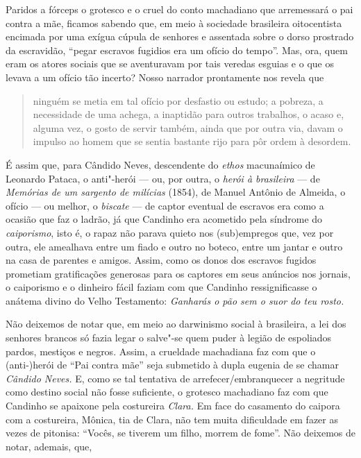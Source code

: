 Paridos a fórceps o grotesco e o cruel do conto machadiano que
arremessará o pai contra a mãe, ficamos sabendo que, em meio à sociedade
brasileira oitocentista encimada por uma exígua cúpula de senhores e
assentada sobre o dorso prostrado da escravidão, ``pegar escravos
fugidios era um ofício do tempo''. Mas, ora, quem eram os atores sociais
que se aventuravam por tais veredas esguias e o que os levava a um
ofício tão incerto? Nosso narrador prontamente nos revela que

\begin{quote}
ninguém se metia em tal ofício por desfastio ou estudo; a pobreza, a
necessidade de uma achega, a inaptidão para outros trabalhos, o acaso e,
alguma vez, o gosto de servir também, ainda que por outra via, davam o
impulso ao homem que se sentia bastante rijo para pôr ordem à desordem.
\end{quote}

É assim que, para Cândido Neves, descendente do \emph{ethos} macunaímico
de Leonardo Pataca, o anti"-herói --- ou, por outra, o \emph{herói à
brasileira} --- de \emph{Memórias de um sargento de milícias} (1854), de
Manuel Antônio de Almeida, o ofício --- ou melhor, o \emph{biscate} --- de
captor eventual de escravos era como a ocasião que faz o ladrão, já que
Candinho era acometido pela síndrome do \emph{caiporismo}, isto é, o
rapaz não parava quieto nos (sub)empregos que, vez por outra, ele
amealhava entre um fiado e outro no boteco, entre um jantar e outro na
casa de parentes e amigos. Assim, como os donos dos escravos fugidos
prometiam gratificações generosas para os captores em seus anúncios nos
jornais, o caiporismo e o dinheiro fácil faziam com que Candinho
ressignificasse o anátema divino do Velho Testamento: \emph{Ganharás o
pão sem o suor do teu rosto. }

Não deixemos de notar que, em meio ao darwinismo social à brasileira, a
lei dos senhores brancos só fazia legar o salve"-se quem puder à legião
de espoliados pardos, mestiços e negros. Assim, a crueldade machadiana
faz com que o \mbox{(anti-)herói} de ``Pai contra mãe'' seja submetido à dupla
eugenia de se chamar \emph{Cândido Neves.} E, como se tal tentativa de
arrefecer/embranquecer a negritude como destino social não fosse
suficiente, o grotesco machadiano faz com que Candinho se apaixone pela
costureira \emph{Clara.} Em face do casamento do caipora com a
costureira, Mônica, tia de Clara, não tem muita dificuldade em fazer as
vezes de pitonisa: ``Vocês, se tiverem um filho, morrem de fome''. Não
deixemos de notar, ademais, que,

